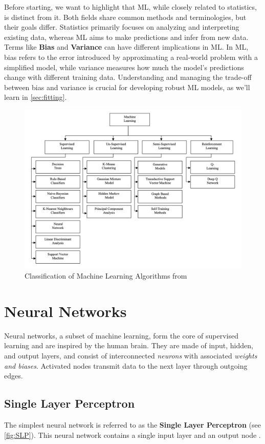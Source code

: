 \documentclass{article}
\begin{document}
Before starting, we want to highlight that ML, while closely related to statistics, is distinct from it. Both fields share common methods and terminologies, but their goals differ. Statistics primarily focuses on analyzing and interpreting existing data, whereas ML aims to make predictions and infer from new data. Terms like \textbf{Bias} and \textbf{Variance} can have different implications in ML. In ML, bias refers to the error introduced by approximating a real-world problem with a simplified model, while variance measures how much the model's predictions change with different training data. Understanding and managing the trade-off between bias and variance is crucial for developing robust ML models, as we'll learn in \autoref{sec:fitting}.
\begin{figure}
  \includegraphics{MachineLearning}
  \caption{Classification of Machine Learning Algorithms from \cite{SurveyML}}
  \label{fig:ML}
\end{figure}
\section{Neural Networks}
Neural networks, a subset of machine learning, form the core of supervised learning and are inspired by the human brain. They are made of input, hidden, and output layers, and consist of interconnected \textit{neurons} with associated \textit{weights and biases}. Activated nodes transmit data to the next layer through outgoing edges.

\subsection{Single Layer Perceptron} \label{sub:Single Layer Perceptron}
The simplest neural network is referred to as the \textbf{Single Layer Perceptron} (see \autoref{fig:SLP}). This neural network contains
a single input layer and an output node \citep{inbook:Aggarwal-1.2}.
\end{document}
